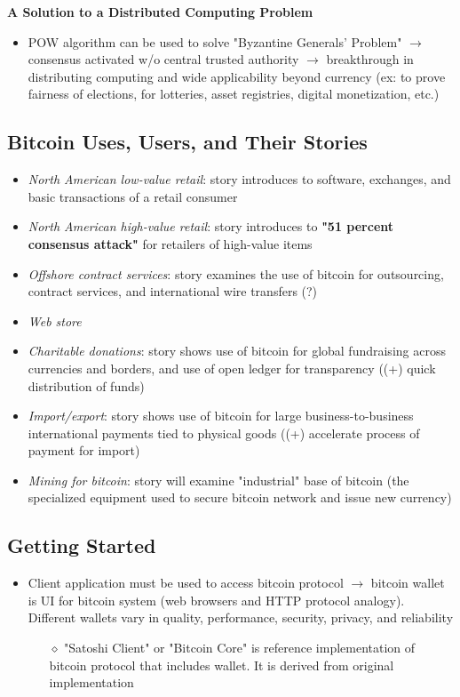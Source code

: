\documentclass[english, 11pt]{article}
\begin{document}
\begin{tcolorbox}
\textbf{A Solution to a Distributed Computing Problem}
\begin{itemize}
    \item POW algorithm can be used to solve "Byzantine Generals' Problem" $\rightarrow$ consensus activated w/o central trusted authority $\rightarrow$ breakthrough in distributing computing and wide applicability beyond currency (ex: to prove fairness of elections, for lotteries, asset registries, digital monetization, etc.)
\end{itemize}
\end{tcolorbox}

\subsection{Bitcoin Uses, Users, and Their Stories}
\begin{itemize}
    \item \textit{North American low-value retail}: story introduces to software, exchanges, and basic transactions of a retail consumer
    \item \textit{North American high-value retail}: story introduces to \textbf{"51 percent consensus attack"} for retailers of high-value items
    \item \textit{Offshore contract services}: story examines the use of bitcoin for outsourcing, contract services, and international wire transfers (?)
    \item \textit{Web store}
    \item \textit{Charitable donations}: story shows use of bitcoin for global fundraising across currencies and borders, and use of open ledger for transparency ((+) quick distribution of funds)
    \item \textit{Import/export}: story shows use of bitcoin for large business-to-business international payments tied to physical goods ((+) accelerate process of payment for import)
    \item \textit{Mining for bitcoin}: story will examine "industrial" base of bitcoin (the specialized equipment used to secure bitcoin network and issue new currency)
\end{itemize}

\subsection{Getting Started}
\begin{itemize}
    \item Client application must be used to access bitcoin protocol $\rightarrow$ bitcoin wallet is UI for bitcoin system (web browsers and HTTP protocol analogy). Different wallets vary in quality, performance, security, privacy, and reliability
    \begin{itemize}
        \item [$\diamond$] "Satoshi Client" or "Bitcoin Core" is reference implementation of bitcoin protocol that includes wallet. It is derived from original implementation
    \end{itemize}
\end{itemize}
\end{document}
